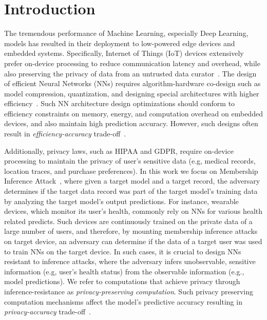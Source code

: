 \section{Introduction}\label{introduction}

The tremendous performance of Machine Learning, especially Deep Learning, models has resulted in their deployment to low-powered edge devices and embedded systems.
Specifically, Internet of Things (IoT) devices extensively prefer on-device processing to reduce communication latency and overhead, while also preserving the privacy of data from an untrusted data curator~\cite{8110880}.
The design of efficient Neural Networks (NNs) requires algorithm-hardware co-design such as model compression, quantization, and designing special architectures with higher efficiency~\cite{8114708}.
Such NN architecture design optimizations should conform to efficiency constraints on memory, energy, and computation overhead on embedded devices, and also maintain high prediction accuracy.
However, such designs often result in \textit{efficiency-accuracy} trade-off~\cite{rastegari2016xnornet}.

Additionally, privacy laws, such as HIPAA and GDPR, require on-device processing to maintain the privacy of user's sensitive data (e.g, medical records, location traces, and purchase preferences).
In this work we focus on Membership Inference Attack~\cite{shokri2017membership}, where given a target model and a target record, the adversary determines if the target data record was part of the target model's training data by analyzing the target model's output predictions.
For instance, wearable devices, which monitor its user's health, commonly rely on NNs for various health related predicts. Such devices are continuously trained on the private data of a large number of users, and therefore, by mounting membership inference attacks on target device, an adversary can determine if the data of a target user was used to train NNs on the target device.
In such cases, it is crucial to design NNs resistant to inference attacks, where the adversary infers unobservable, sensitive information (e.g, user's health status) from the observable information (e.g., model predictions).
We refer to computations that achieve privacy through inference-resistance as {\em privacy-preserving computation}.
Such privacy preserving computation mechanisms affect the model's predictive accuracy resulting in \textit{privacy-accuracy} trade-off~\cite{Abadi:2016:DLD:2976749.2978318,DBLP:conf/ccs/NasrSH18,shejwalkar2019reconciling}.

